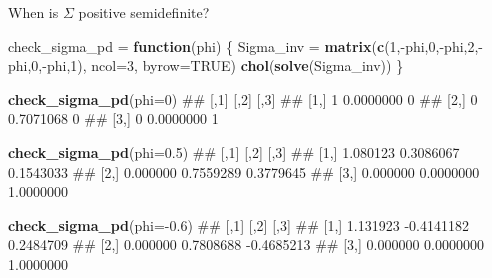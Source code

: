 \documentclass[11pt,ignorenonframetext,]{beamer}
\newenvironment{Shaded}{}{}
\newcommand{\ControlFlowTok}[1]{\textcolor[rgb]{0.00,0.44,0.13}{\textbf{#1}}}
\newcommand{\DataTypeTok}[1]{\textcolor[rgb]{0.56,0.13,0.00}{#1}}
\newcommand{\DecValTok}[1]{\textcolor[rgb]{0.25,0.63,0.44}{#1}}
\newcommand{\FloatTok}[1]{\textcolor[rgb]{0.25,0.63,0.44}{#1}}
\newcommand{\KeywordTok}[1]{\textcolor[rgb]{0.00,0.44,0.13}{\textbf{#1}}}
\newcommand{\NormalTok}[1]{#1}
\newcommand{\OperatorTok}[1]{\textcolor[rgb]{0.40,0.40,0.40}{#1}}
\newcommand{\OtherTok}[1]{\textcolor[rgb]{0.00,0.44,0.13}{#1}}
\newcommand{\StringTok}[1]{\textcolor[rgb]{0.25,0.44,0.63}{#1}}
\let\oldShaded\Shaded
\let\endoldShaded\endShaded
\renewenvironment{Shaded}{\footnotesize\begin{spacing}{0.9}\oldShaded}{\endoldShaded\end{spacing}}
\begin{document}
\begin{frame}[fragile,t]{When is \(\Sigma\) positive semidefinite?}
\protect\hypertarget{when-is-sigma-positive-semidefinite}{}

\begin{Shaded}
\begin{Highlighting}[]
\NormalTok{check_sigma_pd =}\StringTok{ }\ControlFlowTok{function}\NormalTok{(phi) \{}
\NormalTok{  Sigma_inv =}\StringTok{ }\KeywordTok{matrix}\NormalTok{(}\KeywordTok{c}\NormalTok{(}\DecValTok{1}\NormalTok{,}\OperatorTok{-}\NormalTok{phi,}\DecValTok{0}\NormalTok{,}\OperatorTok{-}\NormalTok{phi,}\DecValTok{2}\NormalTok{,}\OperatorTok{-}\NormalTok{phi,}\DecValTok{0}\NormalTok{,}\OperatorTok{-}\NormalTok{phi,}\DecValTok{1}\NormalTok{), }\DataTypeTok{ncol=}\DecValTok{3}\NormalTok{, }\DataTypeTok{byrow=}\OtherTok{TRUE}\NormalTok{) }
  \KeywordTok{chol}\NormalTok{(}\KeywordTok{solve}\NormalTok{(Sigma_inv))}
\NormalTok{\}}

\KeywordTok{check_sigma_pd}\NormalTok{(}\DataTypeTok{phi=}\DecValTok{0}\NormalTok{)}
\NormalTok{##      [,1]      [,2] [,3]}
\NormalTok{## [1,]    1 0.0000000    0}
\NormalTok{## [2,]    0 0.7071068    0}
\NormalTok{## [3,]    0 0.0000000    1}

\KeywordTok{check_sigma_pd}\NormalTok{(}\DataTypeTok{phi=}\FloatTok{0.5}\NormalTok{)}
\NormalTok{##          [,1]      [,2]      [,3]}
\NormalTok{## [1,] 1.080123 0.3086067 0.1543033}
\NormalTok{## [2,] 0.000000 0.7559289 0.3779645}
\NormalTok{## [3,] 0.000000 0.0000000 1.0000000}

\KeywordTok{check_sigma_pd}\NormalTok{(}\DataTypeTok{phi=}\OperatorTok{-}\FloatTok{0.6}\NormalTok{)}
\NormalTok{##          [,1]       [,2]       [,3]}
\NormalTok{## [1,] 1.131923 -0.4141182  0.2484709}
\NormalTok{## [2,] 0.000000  0.7808688 -0.4685213}
\NormalTok{## [3,] 0.000000  0.0000000  1.0000000}
\end{Highlighting}
\end{Shaded}

\end{frame}
\end{document}

